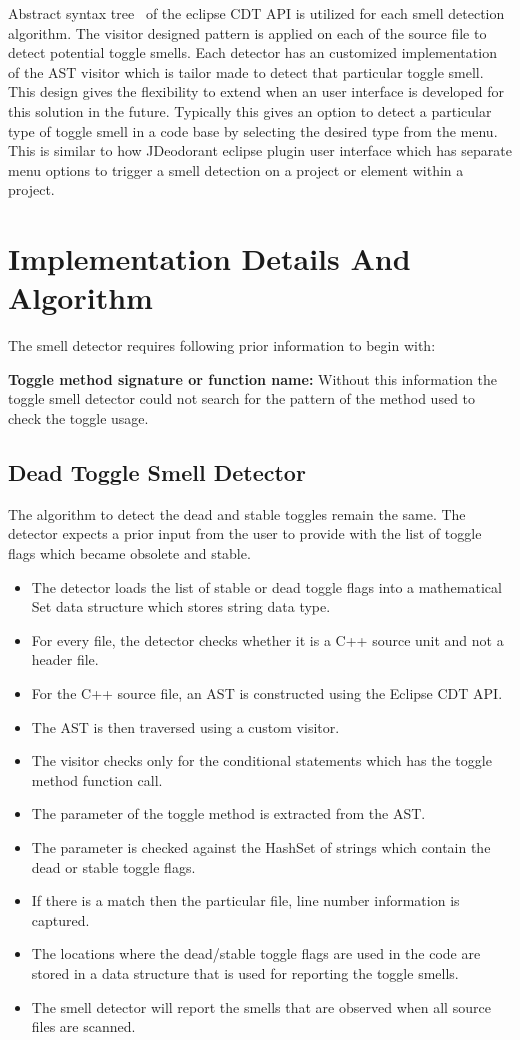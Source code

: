 \documentclass[conference]{IEEEtran}
\begin{document}
Abstract syntax tree~\cite{AbstractSystaxTree} of the eclipse CDT API is utilized for each smell detection algorithm. The visitor designed pattern is applied on each of the source file to detect potential toggle smells. Each detector has an customized implementation of the AST visitor which is tailor made to detect that particular toggle smell. This design gives the flexibility to extend when an user interface is developed for this solution in the future. Typically this gives an option to detect a particular type of toggle smell in a code base by selecting the desired type from the menu. This is similar to how JDeodorant eclipse plugin user interface which has separate menu options to trigger a smell detection on a project or element within a project.

\section{Implementation Details And Algorithm}
\label{Details}
The smell detector requires following prior information to begin with:

\textbf{Toggle method signature or function name:} Without this information the toggle smell detector could not search for the pattern of the method used to check the toggle usage.

\subsection{Dead Toggle Smell Detector}
The algorithm to detect the dead and stable toggles remain the same. The detector expects a prior input from the user to provide with the list of toggle flags which became obsolete and stable. 
\begin{itemize}
  	\item The detector loads the list of stable or dead toggle flags into a mathematical Set data structure which stores string data type.
  	\item For every file, the detector checks whether it is a C++ source unit and not a header file.
  	\item For the C++ source file, an AST is constructed using the Eclipse CDT API.
	\item The AST is then traversed using a custom visitor.
	\item The visitor checks only for the conditional statements which has the toggle method function call.
	\item The parameter of the toggle method is extracted from the AST.
	\item The parameter is checked against the HashSet of strings which contain the dead or stable toggle flags.
	\item If there is a match then the particular file, line number information is captured.
	\item The locations where the dead/stable toggle flags are used in the code are stored in a data structure that is used for reporting the toggle smells.
	\item The smell detector will report the smells that are observed when all source files are scanned.
\end{itemize}
\end{document}
